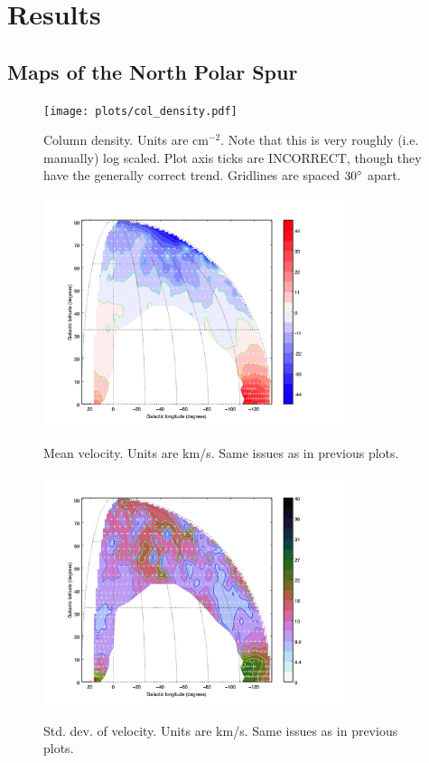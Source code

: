 \documentclass[10pt]{article}
\begin{document}
\section{Results}

\subsection{Maps of the North Polar Spur}

\begin{figure}[!ht]
    \centering
    \texttt{[image: plots/col\_density.pdf]} \\
    \caption{Column density.  Units are $\mathrm{cm}^{-2}$.  Note that this is very roughly (i.e. manually) log scaled.  Plot axis ticks are INCORRECT, though they have the generally correct trend.  Gridlines are spaced $30\degree$ apart.}
    \label{fig:colrho}
\end{figure}
\begin{figure}[!ht]
    \centering
    \includegraphics[width=0.8\textwidth]{plots/veloc_mean.jpg} \\
    \caption{Mean velocity.  Units are km/s.  Same issues as in previous plots.}
    \label{fig:mean}
\end{figure}
\begin{figure}[!ht]
    \centering
    \includegraphics[width=0.8\textwidth]{plots/veloc_std.jpg} \\
    \caption{Std. dev. of velocity.  Units are km/s.  Same issues as in previous plots.}
    \label{fig:stdev}
\end{figure}
\end{document}
